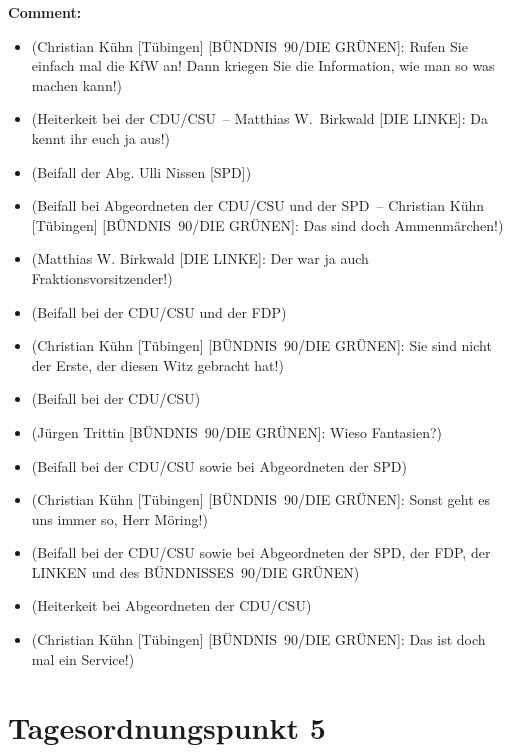 \documentclass{article}
\begin{document}
\noindent\textbf{Comment:}
\begin{itemize}
    \setlength\itemsep{-3pt}
    \item (Christian Kühn [Tübingen] [BÜNDNIS 90/DIE GRÜNEN]: Rufen Sie einfach mal die KfW an! Dann kriegen Sie die Information, wie man so was machen kann!)
    \setlength\itemsep{-3pt}
    \item (Heiterkeit bei der CDU/CSU – Matthias W. Birkwald [DIE LINKE]: Da kennt ihr euch ja aus!)
    \setlength\itemsep{-3pt}
    \item (Beifall der Abg. Ulli Nissen [SPD])
    \setlength\itemsep{-3pt}
    \item (Beifall bei Abgeordneten der CDU/CSU und der SPD – Christian Kühn [Tübingen] [BÜNDNIS 90/DIE GRÜNEN]: Das sind doch Ammenmärchen!)
    \setlength\itemsep{-3pt}
    \item (Matthias W. Birkwald [DIE LINKE]: Der war ja auch Fraktionsvorsitzender!)
    \setlength\itemsep{-3pt}
    \item (Beifall bei der CDU/CSU und der FDP)
    \setlength\itemsep{-3pt}
    \item (Christian Kühn [Tübingen] [BÜNDNIS 90/DIE GRÜNEN]: Sie sind nicht der Erste, der diesen Witz gebracht hat!)
    \setlength\itemsep{-3pt}
    \item (Beifall bei der CDU/CSU)
    \setlength\itemsep{-3pt}
    \item (Jürgen Trittin [BÜNDNIS 90/DIE GRÜNEN]: Wieso Fantasien?)
    \setlength\itemsep{-3pt}
    \item (Beifall bei der CDU/CSU sowie bei Abgeordneten der SPD)
    \setlength\itemsep{-3pt}
    \item (Christian Kühn [Tübingen] [BÜNDNIS 90/DIE GRÜNEN]: Sonst geht es uns immer so, Herr Möring!)
    \setlength\itemsep{-3pt}
    \item (Beifall bei der CDU/CSU sowie bei Abgeordneten der SPD, der FDP, der LINKEN und des BÜNDNISSES 90/DIE GRÜNEN)
    \setlength\itemsep{-3pt}
    \item (Heiterkeit bei Abgeordneten der CDU/CSU)
    \setlength\itemsep{-3pt}
    \item (Christian Kühn [Tübingen] [BÜNDNIS 90/DIE GRÜNEN]: Das ist doch mal ein Service!)
\end{itemize}
\section{Tagesordnungspunkt 5}
\end{document}
